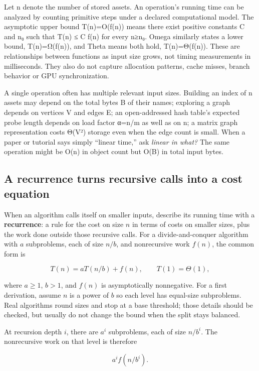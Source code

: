Let n denote the number of stored assets. An operation's running time can be analyzed by counting primitive steps under a declared computational model. The asymptotic upper bound T(n)=O(f(n)) means there exist positive constants C and n₀ such that T(n) ≤ C f(n) for every n≥n₀. Omega similarly states a lower bound, T(n)=Ω(f(n)), and Theta means both hold, T(n)=Θ(f(n)). These are relationships between functions as input size grows, not timing measurements in milliseconds. They also do not capture allocation patterns, cache misses, branch behavior or GPU synchronization.

A single operation often has multiple relevant input sizes. Building an index of n assets may depend on the total bytes B of their names; exploring a graph depends on vertices V and edges E; an open-addressed hash table's expected probe length depends on load factor α=n/m as well as on n; a matrix graph representation costs Θ(V²) storage even when the edge count is small. When a paper or tutorial says simply ``linear time,'' ask \emph{linear in what?} The same operation might be O(n) in object count but O(B) in total input bytes.

\subsection{A recurrence turns recursive calls into a cost equation}\label{01-foundations-i-ch007-a-recurrence-turns-recursive-calls-into-a-cost-equation}

When an algorithm calls itself on smaller inputs, describe its running time with a \textbf{recurrence}: a rule for the cost on size \(n\) in terms of costs on smaller sizes, plus the work done outside those recursive calls. For a divide-and-conquer algorithm with \(a\) subproblems, each of size \(n/b\), and nonrecursive work \(f(n)\), the common form is

\[
T(n)=aT(n/b)+f(n),\qquad T(1)=\Theta(1),
\]

where \(a\geq1\), \(b>1\), and \(f(n)\) is asymptotically nonnegative. For a first derivation, assume \(n\) is a power of \(b\) so each level has equal-size subproblems. Real algorithms round sizes and stop at a base threshold; those details should be checked, but usually do not change the bound when the split stays balanced.

At recursion depth \(i\), there are \(a^i\) subproblems, each of size \(n/b^i\). The nonrecursive work on that level is therefore

\[
a^i f(n/b^i).
\]

